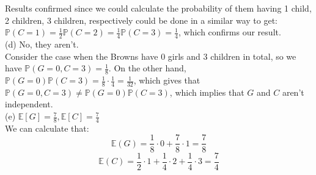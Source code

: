 \documentclass{article}
\begin{document}
Results confirmed since we could calculate the probability of them having 1 child, 2 children, 3 children, respectively could be done in a similar way to get:
$\mathbb{P}(C=1) = \frac{1}{2}
\mathbb{P}(C=2) = \frac{1}{4}
\mathbb{P}(C=3) = \frac{1}{4}$, which confirms our result. \\[.5cm]
{\color{red} (d) No, they aren't. }\\

Consider the case when the Browns have 0 girls and 3 children in total, so we have $\mathbb{P}(G=0,C=3) = \frac{1}{8}.$ On the other hand, $\mathbb{P}(G=0)\mathbb{P}(C=3) = \frac{1}{8}\cdot\frac{1}{4} = \frac{1}{32}$, which gives that $\mathbb{P}(G=0,C=3)\neq\mathbb{P}(G=0)\mathbb{P}(C=3)$, which implies that $G$ and $C$ aren't independent.\\[.5cm]
{\color{red} (e) $\mathbb{E}[G] = \frac{7}{8}, \mathbb{E}[C] = \frac{7}{4}$ }\\

We can calculate that:
$$\mathbb{E}(G) = \frac{1}{8}\cdot0 + \frac{7}{8}\cdot1 = \frac{7}{8}$$
$$\mathbb{E}(C) = \frac{1}{2}\cdot1 + \frac{1}{4}\cdot2 + \frac{1}{4}\cdot3 = \frac{7}{4}$$
\end{document}
